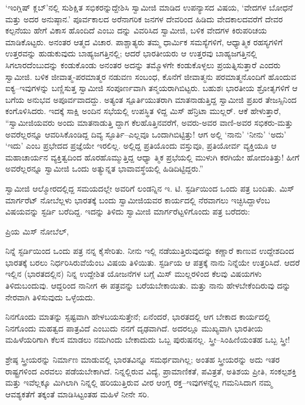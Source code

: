 ‘ಇಂಗ್ಲಿಷ್ ಕ್ಲಬ್​’ನಲ್ಲಿ ಸುಶಿಕ್ಷಿತ ಸಭಿಕರನ್ನುದ್ದೇಶಿಸಿ ಸ್ವಾಮೀಜಿ ಮಾಡಿದ ಉಪನ್ಯಾಸದ ವಿಷಯ, ‘ವೇದಗಳ ಬೋಧನೆ ಮತ್ತು ಅದರ ಅನುಷ್ಠಾನ.’ ಪೂರ್ವಕಾಲದ ಅರೆನಾಗರಿಕ ಜನಗಳ ದೇವರಿಂದ ಹಿಡಿದು ವೇದಕಾಲದವರೆಗೆ ದೇವರ ಕಲ್ಪನೆಯು ಹೇಗೆ ವಿಕಾಸ ಹೊಂದಿದೆ ಎಂಬು ದನ್ನು ವಿವರಿಸಿದ ಸ್ವಾಮೀಜಿ, ಬಳಿಕ ವೇದಗಳ ಕಿರುಪರಿಚಯ ಮಾಡಿಕೊಟ್ಟರು. ಅನಂತರ ಆತ್ಮದ ವಿಚಾರ. ಪಾಶ್ಚಾತ್ಯರು ತಮ್ಮ ಧಾರ್ಮಿಕ ಸಮಸ್ಯೆಗಳಿಗೆ, ಆಧ್ಯಾತ್ಮಿಕ ರಹಸ್ಯಗಳಿಗೆ ಉತ್ತರವನ್ನು ಹುಡುಕುವುದು ಬಾಹ್ಯಜಗತ್ತಿನಲ್ಲಿ; ಆದರೆ ಭಾರತೀಯರು ಆ ಉತ್ತರವು ಬಾಹ್ಯಜಗತ್ತಿನಲ್ಲಿ ಸಿಗಲಾರದೆಂಬುದನ್ನು ಕಂಡುಕೊಂಡು ಅನಂತರ ಅದನ್ನು ತಮ್ಮೊಳಗೇ ಕಂಡುಕೊಳ್ಳಲು ಪ್ರಯತ್ನಿಸುತ್ತಾರೆ ಎಂದರು ಸ್ವಾಮೀಜಿ. ಬಳಿಕ ಜೀವಾತ್ಮ-ಪರಮಾತ್ಮರ ನಡುವಣ ಸಂಬಂಧ, ಕೊನೆಗೆ ಜೀವಾತ್ಮನು ಪರಮಾತ್ಮನೊಂದಿಗೆ ಹೊಂದುವ ಐಕ್ಯ–ಇವುಗಳನ್ನು ಬಣ್ಣಿಸುತ್ತ ಸ್ವಾಮೀಜಿ ಸಂಪೂರ್ಣವಾಗಿ ತನ್ಮಯರಾಗಿಬಿಟ್ಟರು. ಬಹುಶಃ ಭಾರತೀಯ ಶ್ರೋತೃಗಳಿಗೆ ಆ ಬಗೆಯ ಅನುಭವ ಅಪೂರ್ವವಾದದ್ದು. ಅತ್ಯಂತ ಸ್ಪೂರ್ತಿಯುತರಾಗಿ ಮಾತನಾಡುತ್ತಿದ್ದ ಸ್ವಾಮೀಜಿ ಪ್ರಖರ ತೇಜಸ್ಸಿನಿಂದ ಕಂಗೊಳಿಸಿದರು. ಇದಕ್ಕೆ ಸಾಕ್ಷಿ ಅಂದಿನ ಸಭೆಯಲ್ಲಿ ಉಪಸ್ಥಿತ ಳಿದ್ದ ಮಿಸ್ ಹೆನ್ರಿಟಾ ಮುಲ್ಲರ್. ಆಕೆ ಹೇಳುತ್ತಾರೆ, “ಸ್ವಾಮೀಜಿಯವರು ಅಂದು ಮಾತನಾಡುತ್ತಿ ದ್ದಾಗ ಕೆಲಹೊತ್ತಿನವರೆಗೆ, ಅವರು-ಅವರ ವಾಣಿ-ಅವರ ಸಭಿಕರು-ಮತ್ತು ಅವರೆಲ್ಲರನ್ನೂ ಆವರಿಸಿಕೊಂಡಿದ್ದ ದಿವ್ಯ ಸ್ಫೂರ್ತಿ–ಎಲ್ಲವೂ ಒಂದಾಗಿಬಿಟ್ಟಿತ್ತು! ಆಗ ಅಲ್ಲಿ ‘ನಾನು’ ‘ನೀನು’ ‘ಅದು’ ‘ಇದು’ ಎಂಬ ಪ್ರಭೇದದ ಪ್ರಜ್ಞೆಯೇ ಇರಲಿಲ್ಲ. ಅಲ್ಲಿದ್ದ ಪ್ರತಿಯೊಂದು ವಸ್ತುವೂ, ಪ್ರತಿಯೋರ್ವ ವ್ಯಕ್ತಿಯೂ ಆ ಮಹಾಚಾರ್ಯನ ವ್ಯಕ್ತಿತ್ವದಿಂದ ಹೊರಹೊಮ್ಮುತ್ತಿದ್ದ ಆಧ್ಯಾ ತ್ಮಿಕ ಪ್ರಭೆಯಲ್ಲಿ ಮುಳುಗಿ ಕರಗಿಯೇ ಹೋದಂತಿತ್ತು! ಹೀಗೆ ಅವರೆಲ್ಲರನ್ನೂ ಸ್ವಾಮೀಜಿ ಒಂದು ಅತ್ಯುನ್ನತ ಭಾವಾವಸ್ಥೆಯಲ್ಲಿ ಹಿಡಿದಿಟ್ಟಿದ್ದರು.”

ಸ್ವಾಮೀಜಿ ಆಲ್ಮೋರದಲ್ಲಿದ್ದ ಸಮಯದಲ್ಲೇ ಅವರಿಗೆ ಲಂಡನ್ನಿನ ಇ. ಟಿ. ಸ್ಟರ್ಡಿಯಿಂದ ಒಂದು ಪತ್ರ ಬಂದಿತು. ಮಿಸ್ ಮಾರ್ಗರೆಟ್ ನೋಬೆಲ್ಲಳು ಭಾರತಕ್ಕೆ ಬಂದು ಸ್ವಾಮೀಜಿಯವರ ಕಾರ್ಯದಲ್ಲಿ ನೆರವಾಗಲು ಇಚ್ಛಿಸಿದ್ದಾಳೆಂಬ ವಿಷಯವನ್ನು ಸ್ಟರ್ಡಿ ಬರೆದಿದ್ದ. ಇದನ್ನು ತಿಳಿದು ಸ್ವಾಮೀಜಿ ಮಾರ್ಗರೆಟ್ಟಳಿಗೊಂದು ಪತ್ರ ಬರೆದರು:

\noindent

ಪ್ರಿಯ ಮಿಸ್ ನೋಬೆಲ್,

ನಿನ್ನೆ ಸ್ಟರ್ಡಿಯಿಂದ ಒಂದು ಪತ್ರ ನನ್ನ ಕೈಸೇರಿತು. ನೀನು ಇಲ್ಲಿ ನಡೆಯುತ್ತಿರುವುದನ್ನು ಕಣ್ಣಾರೆ ಕಾಣುವ ಉದ್ದೇಶದಿಂದ ಭಾರತಕ್ಕೆ ಬರಲು ನಿರ್ಧರಿಸಿರುವೆಯೆಂಬ ವಿಷಯ ತಿಳಿಯಿತು. ಸ್ಟರ್ಡಿಯ ಆ ಪತ್ರಕ್ಕೆ ನಾನು ನಿನ್ನೆಯೇ ಉತ್ತರಿಸಿದೆ. ಆದರೆ ಇಲ್ಲಿನ (ಭಾರತದಲ್ಲಿನ) ನಿನ್ನ ಉದ್ದೇಶಿತ ಯೋಜನೆಗಳ ಬಗ್ಗೆ ಮಿಸ್ ಮುಲ್ಲರಳಿಂದ ಕೆಲವು ವಿಷಯಗಳು ತಿಳಿದುಬಂದುವು. ಆದ್ದರಿಂದ ನಾನೀಗ ಈ ಪತ್ರವನ್ನು ಬರೆಯಬೇಕಾಯಿತು. ಮತ್ತು ನಾನು ಹೇಳಬೇಕೆಂದಿರುವು ದನ್ನು ನೇರವಾಗಿ ತಿಳಿಸುವುದು ಒಳ್ಳೆಯದು.

ನಿನಗೊಂದು ಮಾತನ್ನು ಸ್ಪಷ್ಟವಾಗಿ ಹೇಳಬಯಸುತ್ತೇನೆ; ಏನೆಂದರೆ, ಭಾರತದಲ್ಲಿ ಆಗ ಬೇಕಾದ ಕಾರ್ಯದಲ್ಲಿ ನಿನಗೊಂದು ಮಹತ್ವದ ಪಾತ್ರವಿದೆ ಎಂಬುದು ನನಗೆ ದೃಢವಾಗಿದೆ. ಅದರಲ್ಲೂ ಮುಖ್ಯವಾಗಿ ಭಾರತೀಯ ಮಹಿಳೆಯರಿಗಾಗಿ ಕೆಲಸ ಮಾಡಲು ನಮಗಿಂದು ಬೇಕಾದುದು ಒಬ್ಬ ಪುರುಷನಲ್ಲ. ಸ್ತ್ರೀ–ಸಿಂಹಿಣಿಯಂತಹ ಒಬ್ಬ ಸ್ತ್ರೀ!

ಶ್ರೇಷ್ಠ ಸ್ತ್ರೀಯರನ್ನು ನಿರ್ಮಾಣ ಮಾಡುವಲ್ಲಿ ಭಾರತವಿನ್ನೂ ಸಮರ್ಥವಾಗಿಲ್ಲ; ಅಂತಹ ಸ್ತ್ರೀಯರನ್ನು ಅದು ಇತರ ರಾಷ್ಟ್ರಗಳಿಂದ ಎರವಲು ಪಡೆಯಬೇಕಾಗಿದೆ. ನಿನ್ನಲ್ಲಿರುವ ವಿದ್ಯೆ, ಪ್ರಾಮಾಣಿಕತೆ, ಪವಿತ್ರತೆ, ಅತಿಶಯ ಪ್ರೀತಿ, ಸಂಕಲ್ಪಶಕ್ತಿ ಮತ್ತು ಇವೆಲ್ಲಕ್ಕೂ ಮಿಗಿಲಾಗಿ ನಿನ್ನಲ್ಲಿ ಹರಿಯುತ್ತಿರುವ ವೀರ ಆಂಗ್ಲ ರಕ್ತ–ಇವುಗಳನ್ನೆಲ್ಲ ಗಮನಿಸಿದಾಗ ನಮ್ಮ ಆವಶ್ಯಕತೆಗೆ ತಕ್ಕಂತೆ ಮಾಡಿಸಿಟ್ಟಂತಹ ಮಹಿಳೆ ನೀನೇ ಸರಿ.

